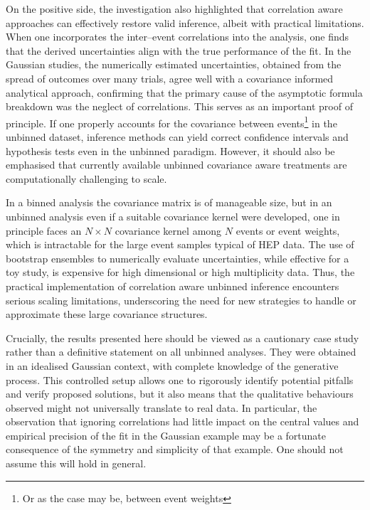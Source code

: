     On the positive side, the investigation also highlighted that correlation aware approaches can effectively restore valid inference, albeit with practical limitations.
    When one incorporates the inter--event correlations into the analysis, one finds that the derived uncertainties align with the true performance of the fit.
    In the Gaussian studies, the numerically estimated uncertainties, obtained from the spread of outcomes over many trials, agree well with a covariance informed analytical approach, confirming that the primary cause of the asymptotic formula breakdown was the neglect of correlations.
    This serves as an important proof of principle.
    If one properly accounts for the covariance between events\footnote{Or as the case may be, between event weights} in the unbinned dataset, inference methods can yield correct confidence intervals and hypothesis tests even in the unbinned paradigm.
    However, it should also be emphasised that currently available unbinned covariance aware treatments are computationally challenging to scale.
    
    In a binned analysis the covariance matrix is of manageable size, but in an unbinned analysis even if a suitable covariance kernel were developed, one in principle faces an $N \times N$ covariance kernel among $N$ events or event weights, which is intractable for the large event samples typical of HEP data.
    The use of bootstrap ensembles to numerically evaluate uncertainties, while effective for a toy study, is expensive for high dimensional or high multiplicity data.
    Thus, the practical implementation of correlation aware unbinned inference encounters serious scaling limitations, underscoring the need for new strategies to handle or approximate these large covariance structures.

    Crucially, the results presented here should be viewed as a cautionary case study rather than a definitive statement on all unbinned analyses. 
    They were obtained in an idealised Gaussian context, with complete knowledge of the generative process.
    This controlled setup allows one to rigorously identify potential pitfalls and verify proposed solutions, but it also means that the qualitative behaviours observed might not universally translate to real data.
    In particular, the observation that ignoring correlations had little impact on the central values and empirical precision of the fit in the Gaussian example may be a fortunate consequence of the symmetry and simplicity of that example.
    One should not assume this will hold in general.
    

